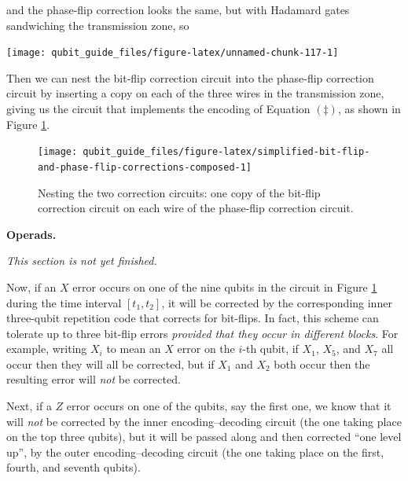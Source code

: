 \documentclass[fleqn,a4paper]{article}
\newenvironment{technical}[1]{\textbf{#1.}\par\vspace{.5\baselineskip}\everypar{\setlength{\parindent}{1.5em}}}{}
\newenvironment{todo}{\color{primary}\emph{This section is not yet finished.}}{}
\theoremstyle{definition}
\theoremstyle{definition}
\theoremstyle{definition}
\theoremstyle{definition}
\theoremstyle{remark}
\begin{document}
and the phase-flip correction looks the same, but with Hadamard gates sandwiching the transmission zone, so

\begin{center}\texttt{[image: qubit\_guide\_files/figure-latex/unnamed-chunk-117-1]} \end{center}

Then we can nest the bit-flip correction circuit into the phase-flip correction circuit by inserting a copy on each of the three wires in the transmission zone, giving us the circuit that implements the encoding of Equation \((\ddagger)\), as shown in Figure \ref{fig:simplified-bit-flip-and-phase-flip-corrections-composed}.



\begin{figure}[H]

{\centering \texttt{[image: qubit\_guide\_files/figure-latex/simplified-bit-flip-and-phase-flip-corrections-composed-1]} 

}

\caption{Nesting the two correction circuits: one copy of the bit-flip correction circuit on each wire of the phase-flip correction circuit.}\label{fig:simplified-bit-flip-and-phase-flip-corrections-composed}
\end{figure}

\begin{technical}{Operads}

\begin{todo}

\end{todo}

\end{technical}

Now, if an \(X\) error occurs on one of the nine qubits in the circuit in Figure \ref{fig:simplified-bit-flip-and-phase-flip-corrections-composed} during the time interval \([t_1,t_2]\), it will be corrected by the corresponding inner three-qubit repetition code that corrects for bit-flips.
In fact, this scheme can tolerate up to three bit-flip errors \emph{provided that they occur in different blocks}.
For example, writing \(X_i\) to mean an \(X\) error on the \(i\)-th qubit, if \(X_1\), \(X_5\), and \(X_7\) all occur then they will all be corrected, but if \(X_1\) and \(X_2\) both occur then the resulting error will \emph{not} be corrected.

Next, if a \(Z\) error occurs on one of the qubits, say the first one, we know that it will \emph{not} be corrected by the inner encoding--decoding circuit (the one taking place on the top three qubits), but it will be passed along and then corrected ``one level up'', by the outer encoding--decoding circuit (the one taking place on the first, fourth, and seventh qubits).
\end{document}
